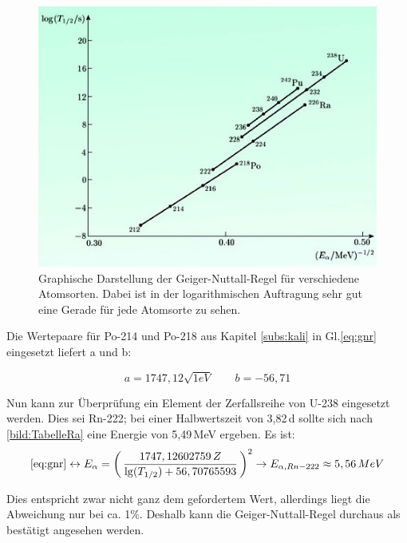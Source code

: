 \begin{figure}[h]
    \centering
    \includegraphics[scale=0.75]{Bilder/Nuttall.jpg}
    \caption{Graphische Darstellung der Geiger-Nuttall-Regel für verschiedene Atomsorten. Dabei ist in der logarithmischen Auftragung sehr gut eine Gerade für jede Atomsorte zu sehen.}
    \label{bild:Nuttall}
\end{figure}


Die Wertepaare für Po-214 und Po-218 aus Kapitel \ref{subs:kali} in Gl.\ref{eq:gnr} eingesetzt liefert a und b:

\begin{equation}
    a = 1747,12 \sqrt{1eV} \qquad b = -56,71
\end{equation}

Nun kann zur Überprüfung ein Element der Zerfallsreihe von U-238 eingesetzt werden. Dies sei Rn-222; bei einer Halbwertszeit von 
3,82\,d sollte sich nach \ref{bild:TabelleRa} eine Energie von 5,49\,MeV ergeben. Es ist: \\

\begin{equation*}
    \ref{eq:gnr}  \leftrightarrow E_{\alpha} = \biggl(\,\frac{1747,12602759 \, Z}{\lg(T_{1/2})+56,70765593}\, \biggr)^2 \\
    \to E_{\alpha, Rn-222} \approx 5,56 \, MeV
\end{equation*}

Dies entspricht zwar nicht ganz dem gefordertem Wert, allerdings liegt die Abweichung nur bei ca. 1\%. Deshalb kann die 
Geiger-Nuttall-Regel durchaus als bestätigt angesehen werden.





